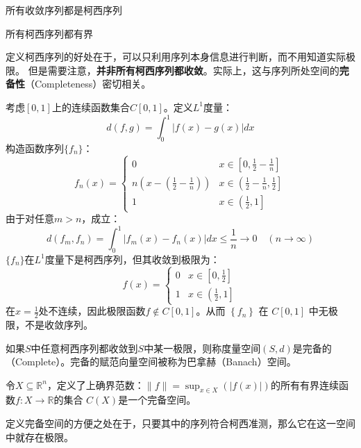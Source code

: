 \begin{theorem}
    所有收敛序列都是柯西序列
\end{theorem}
\begin{theorem}
    所有柯西序列都有界
\end{theorem}
定义柯西序列的好处在于，可以只利用序列本身信息进行判断，而不用知道实际极限。
但是需要注意，\textbf{并非所有柯西序列都收敛}。实际上，这与序列所处空间的\textbf{完备性}（Completeness）密切相关。
\begin{example}
    考虑$\left[0,1\right]$上的连续函数集合$C\left[0,1\right]$。定义$L^1$度量：
    $$d\left(f,g\right) = \int_{0}^{1}\left|f\left(x\right)-g\left(x\right)\right|dx$$
    构造函数序列$\{f_n\}$：
    $$
    f_n(x)= \begin{cases}0 & x \in\left[0, \frac{1}{2}-\frac{1}{n}\right] \\ 
        n\left(x-\left(\frac{1}{2}-\frac{1}{n}\right)\right) & x \in\left(\frac{1}{2}-\frac{1}{n}, \frac{1}{2}\right] 
        \\ 1 & x \in\left(\frac{1}{2}, 1\right] \end{cases}
    $$
    由于对任意$m>n$，成立：
    $$
    d\left(f_m, f_n\right)=\int_0^1\left|f_m(x)-f_n(x)\right| d x \leq \frac{1}{n} \rightarrow 0 \quad(n \rightarrow \infty)
    $$
    $\{f_n\}$在$L^1$度量下是柯西序列，但其收敛到极限为：
    $$
    f(x)= \begin{cases}0 & x \in\left[0, \frac{1}{2}\right] 
        \\ 1 & x \in\left(\frac{1}{2}, 1\right]\end{cases}
    $$
    在$x=\frac{1}{2}$处不连续，因此极限函数$f \notin C[0,1]$。从而 $\left\{f_n\right\}$ 在 $C[0,1]$ 中无极限，不是收敛序列。
\end{example}

\begin{definition}
    如果$S$中任意柯西序列都收敛到$S$中某一极限，则称度量空间$\left(S,d\right)$是完备的（Complete）。完备的赋范向量空间被称为巴拿赫（Banach）空间。
\end{definition}

\begin{theorem} \label{Complete-CX}
    令$X \subseteq \mathbb{R}^n$，定义了上确界范数：$\|f\|=\sup _{x \in X}(|f(x)|)$的所有有界连续函数$f: X \rightarrow \mathbb{R}$的集合
    $C(X)$是一个完备空间。
\end{theorem}

定义完备空间的方便之处在于，只要其中的序列符合柯西准测，那么它在这一空间中就存在极限。


